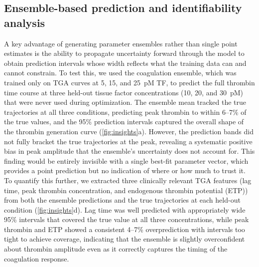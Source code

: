 \documentclass[preprint,review,12pt]{elsarticle}
\begin{document}
\subsection{Ensemble-based prediction and identifiability analysis}\label{sec:ensemble_insights}
A key advantage of generating parameter ensembles rather than single point estimates is the ability to propagate uncertainty forward through the model to obtain prediction intervals whose width reflects what the training data can and cannot constrain.
To test this, we used the coagulation ensemble, which was trained only on TGA curves at 5, 15, and 25~pM TF, to predict the full thrombin time course at three held-out tissue factor concentrations (10, 20, and 30~pM) that were never used during optimization.
The ensemble mean tracked the true trajectories at all three conditions, predicting peak thrombin to within 6--7\% of the true values, and the 95\% prediction intervals captured the overall shape of the thrombin generation curve (\cref{fig:insights}a).
However, the prediction bands did not fully bracket the true trajectories at the peak, revealing a systematic positive bias in peak amplitude that the ensemble's uncertainty does not account for. This finding would be entirely invisible with a single best-fit parameter vector, which provides a point prediction but no indication of where or how much to trust it.
To quantify this further, we extracted three clinically relevant TGA features (lag time, peak thrombin concentration, and endogenous thrombin potential (ETP)) from both the ensemble predictions and the true trajectories at each held-out condition (\cref{fig:insights}d).
Lag time was well predicted with appropriately wide 95\% intervals that covered the true value at all three concentrations, while peak thrombin and ETP showed a consistent 4--7\% overprediction with intervals too tight to achieve coverage, indicating that the ensemble is slightly overconfident about thrombin amplitude even as it correctly captures the timing of the coagulation response.
\end{document}
